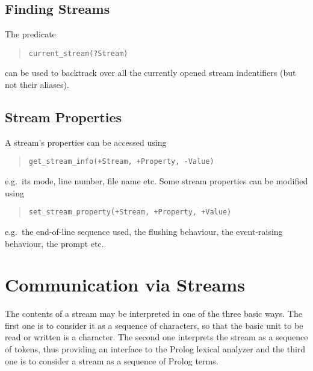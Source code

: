 \subsection{Finding Streams}
The predicate
\begin{quote}\begin{verbatim}
current_stream(?Stream)
\end{verbatim}\end{quote}
can be used to backtrack over all the currently opened stream
indentifiers (but not their aliases).


\subsection{Stream Properties}
A stream's properties can be accessed using
\begin{quote}\begin{verbatim}
get_stream_info(+Stream, +Property, -Value)
\end{verbatim}\end{quote}
e.g.\ its mode, line number, file name etc.
Some stream properties can be modified using
\begin{quote}\begin{verbatim}
set_stream_property(+Stream, +Property, +Value)
\end{verbatim}\end{quote}
e.g.\ the end-of-line sequence used, the flushing behaviour, the event-raising
behaviour, the prompt etc.


\section{Communication via Streams}
The contents of a stream may be interpreted in one of the
three basic ways.
The first one is to
consider it as a sequence of characters, so that the basic unit to
be read or written is a character. The second one interprets
the stream as a sequence of tokens, thus providing an interface
to the Prolog lexical analyzer and the third one is to consider a stream as
a sequence of Prolog terms.

